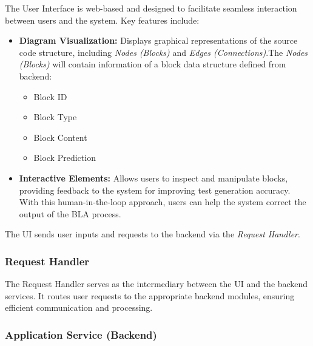 \hspace{0.5cm}The User Interface is web-based and designed to facilitate seamless interaction between users and the system. Key features include:
\begin{itemize}
    \item \textbf{Diagram Visualization:} Displays graphical representations of the source code structure, including \textit{Nodes (Blocks)} and \textit{Edges (Connections)}.The \textit{Nodes (Blocks)} will contain information of a block data structure defined from backend: 
		\begin{itemize}
			\item Block ID
			\item Block Type
			\item Block Content
			\item Block Prediction
		\end{itemize}
    \item \textbf{Interactive Elements:} Allows users to inspect and manipulate blocks, providing feedback to the system for improving test generation accuracy. With this human-in-the-loop approach, users can help the system correct the output of the BLA process.
\end{itemize}

\hspace{0.5cm}The UI sends user inputs and requests to the backend via the \textit{Request Handler}.

\subsubsection{Request Handler}

\hspace{0.5cm}The Request Handler serves as the intermediary between the UI and the backend services. It routes user requests to the appropriate backend modules, ensuring efficient communication and processing.

\subsubsection{Application Service (Backend)}

